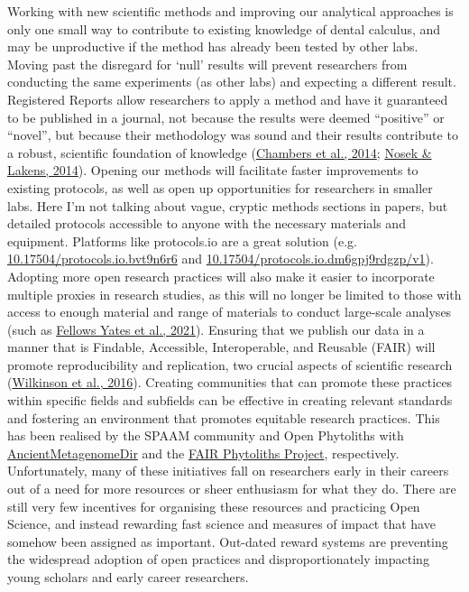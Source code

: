 \documentclass[
  b5paper,
]{book}
\begin{document}
Working with new scientific methods and improving our analytical
approaches is only one small way to contribute to existing knowledge of
dental calculus, and may be unproductive if the method has already been
tested by other labs. Moving past the disregard for `null' results will
prevent researchers from conducting the same experiments (as other labs)
and expecting a different result. Registered Reports allow researchers
to apply a method and have it guaranteed to be published in a journal,
not because the results were deemed ``positive'' or ``novel'', but
because their methodology was sound and their results contribute to a
robust, scientific foundation of knowledge
(\protect\hyperlink{ref-chambersInsteadPlaying2014}{Chambers et al.,
2014}; \protect\hyperlink{ref-nosekRegisteredReports2014}{Nosek \&
Lakens, 2014}). Opening our methods will facilitate faster improvements
to existing protocols, as well as open up opportunities for researchers
in smaller labs. Here I'm not talking about vague, cryptic methods
sections in papers, but detailed protocols accessible to anyone with the
necessary materials and equipment. Platforms like protocols.io are a
great solution (e.g.~
\href{dx.doi.org/10.17504/protocols.io.bvt9n6r6}{10.17504/protocols.io.bvt9n6r6}
and
\href{dx.doi.org/10.17504/protocols.io.dm6gpj9rdgzp/v1}{10.17504/protocols.io.dm6gpj9rdgzp/v1}).
Adopting more open research practices will also make it easier to
incorporate multiple proxies in research studies, as this will no longer
be limited to those with access to enough material and range of
materials to conduct large-scale analyses (such as
\protect\hyperlink{ref-yatesOralMicrobiome2021}{Fellows Yates et al.,
2021}). Ensuring that we publish our data in a manner that is Findable,
Accessible, Interoperable, and Reusable (FAIR) will promote
reproducibility and replication, two crucial aspects of scientific
research (\protect\hyperlink{ref-wilkinsonFAIRGuiding2016}{Wilkinson et
al., 2016}). Creating communities that can promote these practices
within specific fields and subfields can be effective in creating
relevant standards and fostering an environment that promotes equitable
research practices. This has been realised by the SPAAM community and
Open Phytoliths with
\href{https://zenodo.org/record/7789069}{AncientMetagenomeDir} and the
\href{https://zenodo.org/record/6435441}{FAIR Phytoliths Project},
respectively. Unfortunately, many of these initiatives fall on
researchers early in their careers out of a need for more resources or
sheer enthusiasm for what they do. There are still very few incentives
for organising these resources and practicing Open Science, and instead
rewarding fast science and measures of impact that have somehow been
assigned as important. Out-dated reward systems are preventing the
widespread adoption of open practices and disproportionately impacting
young scholars and early career researchers.
\end{document}
